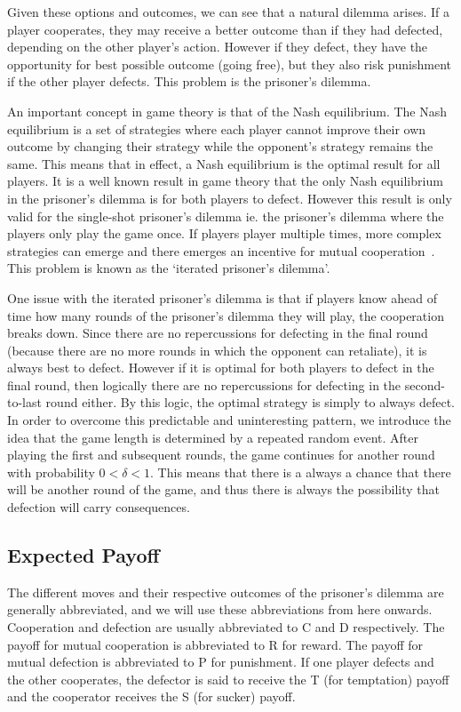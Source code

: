 \documentclass[a4paper,12pt]{article}
\begin{document}
Given these options and outcomes, we can see that a natural dilemma arises.
If a player cooperates, they may receive a better outcome than if they had defected, depending on the other player's action.
However if they defect, they have the opportunity for best possible outcome (going free), but they also risk punishment if the other player defects.
This problem is the prisoner's dilemma.

An important concept in game theory is that of the Nash equilibrium.
The Nash equilibrium is a set of strategies where each player cannot improve their own outcome by changing their strategy while the opponent's strategy remains the same.
This means that in effect, a Nash equilibrium is the optimal result for all players.
It is a well known result in game theory that the only Nash equilibrium in the prisoner's dilemma is for both players to defect.
However this result is only valid for the single-shot prisoner's dilemma ie. the prisoner's dilemma where the players only play the game once.
If players player multiple times, more complex strategies can emerge and there emerges an incentive for mutual cooperation~\cite{trivers}.
This problem is known as the `iterated prisoner's dilemma'.

One issue with the iterated prisoner's dilemma is that if players know ahead of time how many rounds of the prisoner's dilemma they will play, the cooperation breaks down.
Since there are no repercussions for defecting in the final round (because there are no more rounds in which the opponent can retaliate), it is always best to defect.
However if it is optimal for both players to defect in the final round, then logically there are no repercussions for defecting in the second-to-last round either.
By this logic, the optimal strategy is simply to always defect.
In order to overcome this predictable and uninteresting pattern, we introduce the idea that the game length is determined by a repeated random event.
After playing the first and subsequent rounds, the game continues for another round with probability $0 < \delta < 1$.
This means that there is a always a chance that there will be another round of the game, and thus there is always the possibility that defection will carry consequences.

\subsection{Expected Payoff}

The different moves and their respective outcomes of the prisoner's dilemma are generally abbreviated, and we will use these abbreviations from here onwards.
Cooperation and defection are usually abbreviated to C and D respectively.
The payoff for mutual cooperation is abbreviated to R for reward.
The payoff for mutual defection is abbreviated to P for punishment.
If one player defects and the other cooperates, the defector is said to receive the T (for temptation) payoff and the cooperator receives the S (for sucker) payoff.
\end{document}
